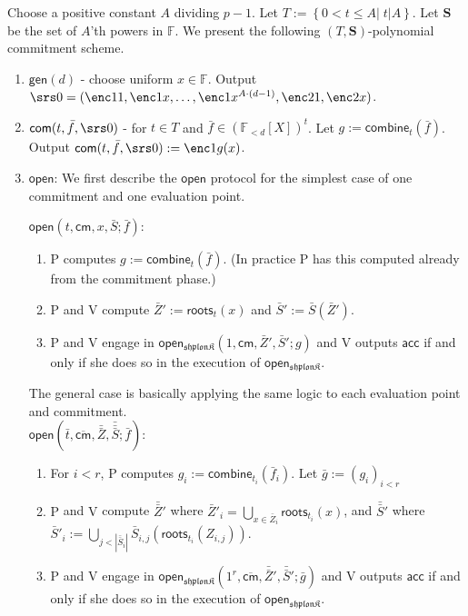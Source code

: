 \documentclass[11pt]{article} %
\newcommand{\F}{\ensuremath{\mathbb F}\xspace}
\newcommand{\vecc}[2]{\ensuremath{(#1)_{#2}}\xspace}
\newcommand{\com}{\ensuremath{\mathsf{com}}\xspace}
\newcommand{\cm}{\ensuremath{\mathsf{cm}}\xspace}
\newcommand{\cmm}{\ensuremath{\mathsf{\overline{cm}}}\xspace}
\newcommand{\open}{\ensuremath{\mathsf{open}}\xspace}
\newcommand{\acc}{\ensuremath{\mathsf{acc}}\xspace}
\newcommand{\defeq}{:=}
\newcommand{\gen}{\ensuremath{\mathsf{gen}}\xspace}
\newcommand{\prvpc}{\ensuremath{\mathrm{P}}\xspace}%
\newcommand{\verpc}{\ensuremath{\mathrm{V}}\xspace}%
\newcommand{\shplonk}{\ensuremath{\mathfrak{sh}\mathfrak{p}\mathfrak{lon}\mathfrak{K}}\xspace}
\newcommand{\set}[1]{\ensuremath{\left\{#1\right\}}\xspace}
\newcommand{\polyvecs}[2]{\ensuremath{(\F_{< #1}[X])^{#2}}\xspace}
\newcommand{\Z}{\mathbb{Z}}
\newcommand{\openset}{\ensuremath{\mathbf{S}}\xspace}
\newcommand{\combine}[2]{\ensuremath{\mathsf{combine}_{#1}(#2)}\xspace}
\newcommand{\roots}[2]{\ensuremath{\mathsf{roots}_{#1}(#2)}\xspace}
\newcommand{\f}{\ensuremath{\bar{f}}\xspace}
\renewcommand{\t}{\ensuremath{\bar{t}}\xspace}
\renewcommand{\g}{\ensuremath{\bar{g}}\xspace}
\renewcommand{\S}{\ensuremath{\bar{S}}\xspace}
\renewcommand{\Z}{\ensuremath{\bar{Z}}\xspace}
\newcommand{\ZZ}{\ensuremath{\bar{\bar{Z}}}\xspace}
\renewcommand{\SS}{\ensuremath{\bar{\bar{S}}}\xspace}
\newcommand{\SSS}{\ensuremath{\bar{\bar{\bar{S}}}}\xspace}
\newcommand{\openshplonk}{\ensuremath{\mathsf{open_{\shplonk}}}\xspace}
\begin{document}
Choose a positive constant $A$ dividing $p-1$. Let $T\defeq \set{0< t\leq A|\; t|A}$. 
Let $\openset$ be the set of $A$'th powers in \F.
We present the following $(T,\openset)$-polynomial commitment scheme.
\begin{enumerate}
 \item $\gen(d)$ - choose uniform $x\in \F$. Output $\srs0 =(\enc1{1},\enc1{x},\ldots,\enc1{x^{A\cdot (d-1)}},\enc2{1},\enc2{x})$.
 \item   $\com(t,\f,\srs0)$ -  for $t\in T$ and $\f\in \polyvecs{d}{t}$. Let $g\defeq \combine{t}{\f}$. Output $\com(t,\f,\srs0) \defeq \enc1{g(x)}$.
 
 \item \open:
 We first describe the \open protocol for the simplest case of one commitment and one evaluation point.
 
 $\open\left(t,\cm,x,\S;\f\right)$:
 \begin{enumerate}
  \item \prvpc computes $g\defeq \combine{t}{\f}$. (In practice \prvpc has this computed already from the commitment phase.)
  \item \prvpc and \verpc compute $\Z' \defeq \roots{t}{x}$ and $\S'\defeq \S(\Z')$.
  \item \prvpc and \verpc engage in $\openshplonk(1,\cm,\Z',\S';g)$
and \verpc outputs \acc if and only if she does so in the execution of \openshplonk.    
  \end{enumerate}
  
The general case is basically applying the same logic to each evaluation point and commitment. \\
 $\open\left(\t,\cmm,\ZZ,\SSS;\f\right)$:
 \begin{enumerate}
  \item For $i<r$, \prvpc computes $g_i\defeq \combine{t_i}{\f_i}$. Let $\g\defeq \vecc{g_i}{i<r}$
  \item \prvpc and \verpc compute $\ZZ'$ where $\Z'_i = \bigcup_{x\in \Z_i}{\roots{t_i}{x}} $, and  $\SS'$ where $\S'_{i}\defeq \bigcup_{j<|\SS_i|} \S_{i,j}(\roots{t_i}{Z_{i,j}})$.
  \item \prvpc and \verpc engage in $\openshplonk(1^r,\cmm,\ZZ',\SS';\g)$ and \verpc outputs \acc if and only if she does so in the execution of \openshplonk.    
  \end{enumerate}
  

 \end{enumerate}
\end{document}
